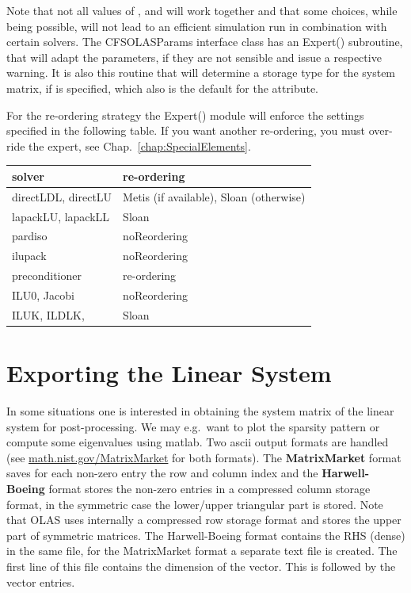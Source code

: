 %
%
Note that not all values of ,  and 
will work together and that some choices, while being possible, will not lead
to an efficient simulation run in combination with certain solvers. The
CFSOLASParams interface class has an Expert() subroutine, that will adapt the
parameters, if they are not sensible and issue a respective warning. It is also
this routine that will determine a storage type for the system matrix, if
 is specified, which also is the default for the
 attribute.

For the re-ordering strategy the Expert() module will enforce the settings
specified in the following table. If you want another re-ordering, you must
over-ride the expert, see Chap.~\ref{chap:SpecialElements}.
%
%
\begin{center}
\begin{tabular}{ll}
\toprule
solver              & re-ordering                             \\
\midrule
directLDL, directLU & Metis (if available), Sloan (otherwise) \\
lapackLU, lapackLL  & Sloan                                   \\
pardiso             & noReordering                            \\
ilupack             & noReordering                            \\
\midrule
preconditioner      & re-ordering                             \\
\midrule
ILU0, Jacobi  & noReordering                      \\
ILUK, ILDLK,    & Sloan                              \\
\bottomrule
\end{tabular}
\end{center}
%
%
\section{Exporting the Linear System}
%
%
In some situations one is interested in obtaining the system matrix of the
linear system for post-processing. We may e.g.~want to plot the sparsity
pattern or compute some eigenvalues using matlab. Two ascii output formats are
handled (see \url{math.nist.gov/MatrixMarket} for both formats). The
\textbf{MatrixMarket} format saves for each non-zero entry the row and column
index and the \textbf{Harwell-Boeing} format stores the non-zero entries in a
compressed column storage format, in the symmetric case the lower/upper
triangular part is stored. Note that OLAS uses internally a compressed row
storage format and stores the upper part of symmetric matrices. The
Harwell-Boeing format contains the RHS (dense) in the same file, for the
MatrixMarket format a separate text file is created. The first line of this
file contains the dimension of the vector. This is followed by the vector
entries.

